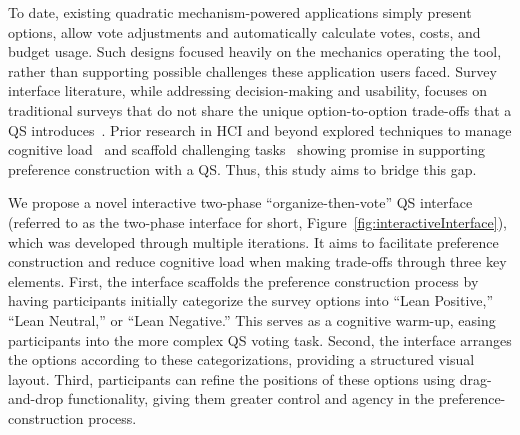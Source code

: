 
To date, existing quadratic mechanism-powered applications simply present options, allow vote adjustments and automatically calculate votes, costs, and budget usage. Such designs focused heavily on the mechanics operating the tool, rather than supporting possible challenges these application users faced. Survey interface literature, while addressing decision-making and usability, focuses on traditional surveys that do not share the unique option-to-option trade-offs that a QS introduces~\cite{engstrom2020politics, weijtersEffectRatingScale2010, kierujVariationsResponseStyle2010, toepoelSmileysStarsHearts2019, farzandAestheticsEvaluatingResponse2024, pielotDidYouMisclick2024}. Prior research in HCI and beyond explored techniques to manage cognitive load~\cite{paula2023, oviatt2006human, toepoelSmileysStarsHearts2019, softwareBrad2021, reis2012towards} and scaffold challenging tasks~\cite{task2014, moderate2021, ibiliEffectAugmentedReality2019, amyChatSensing2018} showing promise in supporting preference construction with a QS. Thus, this study aims to bridge this gap.


We propose a novel interactive two-phase ``organize-then-vote'' QS interface (referred to as the two-phase interface for short, Figure~\ref{fig:interactiveInterface}), which was developed through multiple iterations. It aims to facilitate preference construction and reduce cognitive load when making trade-offs through three key elements. First, the interface scaffolds the preference construction process by having participants initially categorize the survey options into ``Lean Positive,'' ``Lean Neutral,'' or ``Lean Negative.'' This serves as a cognitive warm-up, easing participants into the more complex QS voting task. Second, the interface arranges the options according to these categorizations, providing a structured visual layout. Third, participants can refine the positions of these options using drag-and-drop functionality, giving them greater control and agency in the preference-construction process. %

